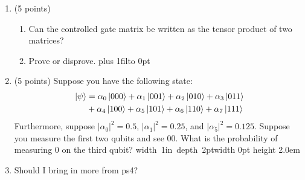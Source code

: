 \documentclass[12pt]{article}
\newcommand{\Blank}{\mbox{\hskip 4pt\vrule width 1in depth 2pt}\vrule width 0pt height 2.0em}
\def\DefaultSpace{1in}
\newcommand{\LeaveSpace}[1][\DefaultSpace]{%
\vskip #1 plus 1fil\relax\hbox to 0pt{\hss} %
}
\begin{document}
\begin{enumerate}[font=\bfseries]
    \item (5 points) 
    \begin{enumerate}[label=\theenumi.\arabic*]
    \item Can the controlled \PauliZ{} gate matrix be written as the tensor product of two matrices?
    \item Prove or disprove. \LeaveSpace[2.5in]    
    \end{enumerate}

    \item (5 points) Suppose you have the following state:
    \begin{align*} \ket{\psi} & = 
        \alpha_0\ket{000} + \alpha_1\ket{001} +
                    \alpha_2\ket{010} +  \alpha_3\ket{011}  \\
                    & + \alpha_4\ket{100} + \alpha_5\ket{101} +
                    \alpha_6\ket{110} + \alpha_7\ket{111}
    \end{align*}
    Furthermore, suppose $|\alpha_0|^2 = 0.5$, $|\alpha_1|^2 = 0.25$, and $|\alpha_5|^2 = 0.125$. Suppose you measure the first two qubits and see $00$. What is the probability of measuring 0 on the third qubit? \Blank{}

    \item Should I bring in more from ps4?
\end{enumerate}
\end{document}
